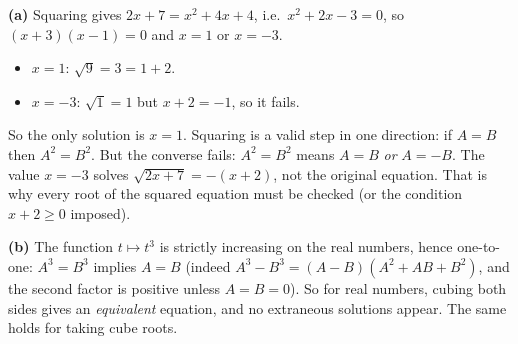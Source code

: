 \textbf{(a)} Squaring gives $2x+7=x^2+4x+4$, i.e.\ $x^2+2x-3=0$, so $(x+3)(x-1)=0$ and $x=1$ or $x=-3$.
\begin{itemize}
\item $x=1$: $\sqrt9=3=1+2$. \checkmark
\item $x=-3$: $\sqrt1=1$ but $x+2=-1$, so it fails.
\end{itemize}
So the only solution is $\boxed{x=1}$. Squaring is a valid step in one direction: if $A=B$ then $A^2=B^2$. But the converse fails: $A^2=B^2$ means $A=B$ \emph{or} $A=-B$. The value $x=-3$ solves $\sqrt{2x+7}=-(x+2)$, not the original equation. That is why every root of the squared equation must be checked (or the condition $x+2\ge0$ imposed).

\textbf{(b)} The function $t\mapsto t^3$ is strictly increasing on the real numbers, hence one-to-one: $A^3=B^3$ implies $A=B$ (indeed $A^3-B^3=(A-B)\left(A^2+AB+B^2\right)$, and the second factor is positive unless $A=B=0$). So for real numbers, cubing both sides gives an \emph{equivalent} equation, and no extraneous solutions appear. The same holds for taking cube roots.
